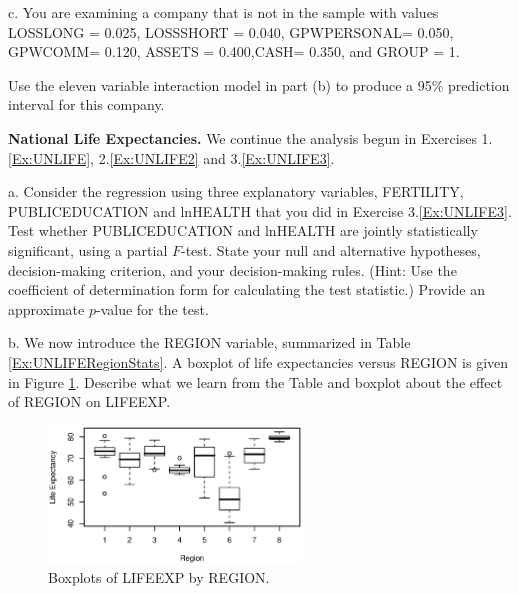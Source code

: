\begin{exercises}
c. You are examining a company that is not in the sample with values
LOSSLONG = 0.025, LOSSSHORT = 0.040, GPWPERSONAL= 0.050, GPWCOMM=
0.120, ASSETS = 0.400,CASH= 0.350, and GROUP = 1.

Use the eleven variable interaction model in part (b) to produce a
95\% prediction interval for this company.


\item \textbf{National Life Expectancies.}\label{Ex:UNLIFE4} We
continue the analysis begun in Exercises 1.\ref{Ex:UNLIFE},
2.\ref{Ex:UNLIFE2} and 3.\ref{Ex:UNLIFE3}.

a. Consider the regression using three explanatory variables,
FERTILITY, PUBLICEDUCATION and lnHEALTH that you did in Exercise
3.\ref{Ex:UNLIFE3}. Test whether PUBLICEDUCATION and lnHEALTH are
jointly statistically significant, using a partial $F$-test. State
your null and alternative hypotheses, decision-making criterion, and
your decision-making rules. (Hint: Use the coefficient of
determination form for calculating the test statistic.) Provide an
approximate $p$-value for the test.

b. We now introduce the REGION variable, summarized in Table
\ref{Ex:UNLIFERegionStats}. A boxplot of life expectancies versus
REGION is given in Figure \ref{Ex:UNLIFEPlot3}. Describe what we
learn from the Table and boxplot about the effect of REGION on
LIFEEXP.


\begin{figure}[htp]
  \begin{center}
   \includegraphics[width=0.6\textwidth]{Chapter4/UNLife3.eps}
   \caption{\label{Ex:UNLIFEPlot3} \small  Boxplots of LIFEEXP by REGION.}
  \end{center}
\end{figure}


\begin{table}[h]


\end{table}
\end{exercises}
